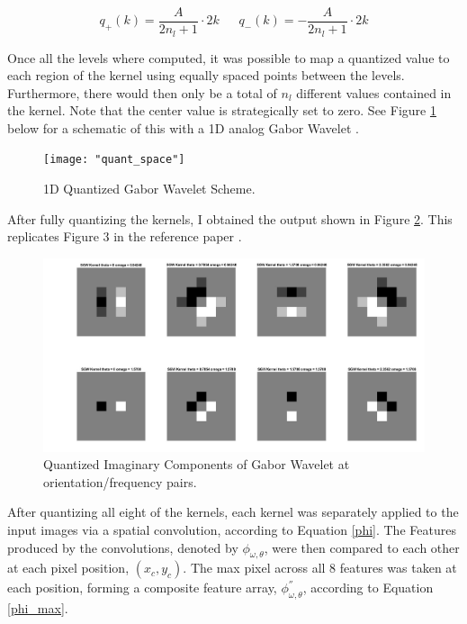 \documentclass[./rarnold_final_project.tex]{subfiles}
\begin{document}
\begin{equation}
\label{quant}
q_{+}(k)=\frac{A}{2n_l + 1}\cdot 2k \:\:\:\:\:\:\: q_{-}(k) = - \frac{A}{2n_l + 1} \cdot 2k
\end{equation}

\noindent Once all the levels where computed, it was possible to map a quantized value to each region of the kernel using equally spaced points between the levels.  Furthermore, there would then only be a total of $n_l$ different values contained in the kernel.  Note that the center value is strategically set to zero.  See Figure \ref{1dquant} below for a schematic of this with a 1D analog Gabor Wavelet \cite{ref13}.

	\begin{figure}[!htbp]
	\centering
	\texttt{[image: "quant\_space"]}
	\captionsetup{justification=centering}
	\caption{1D Quantized Gabor Wavelet Scheme.} 
	\label{1dquant}
	\end{figure}

\noindent After fully quantizing the kernels, I obtained the output shown in Figure \ref{kernels}.  This replicates Figure 3 in the reference paper \cite{main}. 

\clearpage

	\begin{figure}[!htbp]
	\centering
	\includegraphics[scale=0.38]{"kernels"}
	\captionsetup{justification=centering}
	\caption{Quantized Imaginary Components of Gabor Wavelet at orientation/frequency pairs.} 
	\label{kernels}
	\end{figure}
	
\noindent After quantizing all eight of the kernels, each kernel was separately applied to the input images via a spatial convolution, according to Equation \eqref{phi}.  The Features produced by the convolutions, denoted by $\phi_{\omega, \theta}$, were then compared to each other at each pixel position, $(x_c, y_c)$.  The max pixel across all 8 features was taken at each position, forming a composite feature array, $\phi^{''}_{\omega, \theta}$, according to Equation \eqref{phi_max}. 
 
\end{document}
